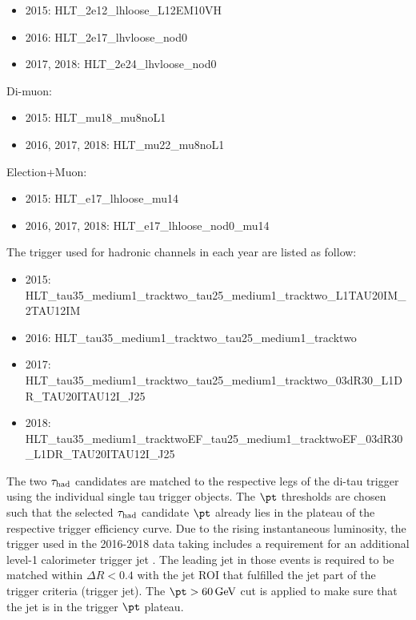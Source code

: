 \begin{itemize}
\item 2015: HLT\_2e12\_lhloose\_L12EM10VH
\item 2016: HLT\_2e17\_lhvloose\_nod0
\item 2017, 2018: HLT\_2e24\_lhvloose\_nod0
\end{itemize}

Di-muon:

\begin{itemize}
\item 2015: HLT\_mu18\_mu8noL1
\item 2016, 2017, 2018: HLT\_mu22\_mu8noL1
\end{itemize}

Election+Muon:

\begin{itemize}
\item 2015: HLT\_e17\_lhloose\_mu14
\item 2016, 2017, 2018: HLT\_e17\_lhloose\_nod0\_mu14
\end{itemize}

The trigger used for hadronic channels in each year are listed as follow:
\begin{itemize}
\small
\item 2015: HLT\_tau35\_medium1\_tracktwo\_tau25\_medium1\_tracktwo\_L1TAU20IM\_2TAU12IM
\item 2016: HLT\_tau35\_medium1\_tracktwo\_tau25\_medium1\_tracktwo
\item 2017: HLT\_tau35\_medium1\_tracktwo\_tau25\_medium1\_tracktwo\_03dR30\_L1DR\_TAU20ITAU12I\_J25
\item 2018: HLT\_tau35\_medium1\_tracktwoEF\_tau25\_medium1\_tracktwoEF\_03dR30\_L1DR\_TAU20ITAU12I\_J25

 \end{itemize}

The two $\tau_\text{had}$ candidates are matched to the respective legs of the di-tau trigger using the individual single tau trigger objects. The $\pt$ thresholds are chosen such that the selected $\tau_\text{had}$ candidate $\pt$ already lies in the plateau of the respective trigger efficiency curve. Due to the rising instantaneous luminosity, the trigger used in the 2016-2018 data taking includes a requirement for an additional level-1 calorimeter trigger jet 
. The leading jet in those events is required to be matched within $\Delta R < 0.4$ with the jet ROI that fulfilled the jet part of the trigger criteria (trigger jet). The $\pt > \SI{60}{\GeV}$ cut is applied to make sure that the jet is in the trigger $\pt$ plateau.

